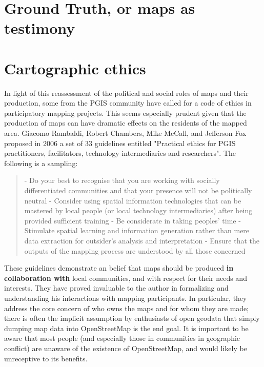 \documentclass[11pt]{report}
\begin{document}
\section{Ground Truth, or maps as testimony}

\section{Cartographic ethics}

In light of this reassessment of the political and social roles of maps and their production, some from the PGIS community have called for a code of ethics in participatory mapping projects. This seems especially prudent given that the production of maps can have dramatic effects on the residents of the mapped area. Giacomo Rambaldi, Robert Chambers, Mike McCall, and Jefferson Fox proposed in 2006 a set of 33 guidelines entitled "Practical ethics for PGIS practitioners, facilitators, technology intermediaries and researchers". The following is a sampling:

\begin{quote}
- Do your best to recognise that you are working with socially differentiated communities and that your presence will not be politically neutral
- Consider using spatial information technologies that can be mastered by local people (or local technology intermediaries) after being provided sufficient training
- Be considerate in taking peoples' time
- Stimulate spatial learning and information generation rather than mere data extraction for outsider’s analysis and interpretation
- Ensure that the outputs of the mapping process are understood by all those concerned
\cite{rambaldi2006practical}
\end{quote}

These guidelines demonstrate an belief that maps should be produced \textbf{in collaboration with} local communities, and with respect for their needs and interests. They have proved invaluable to the author in formalizing and understanding his interactions with mapping participants. In particular, they address the core concern of who owns the maps and for whom they are made; there is often the implicit assumption by enthusiasts of open geodata that simply dumping map data into OpenStreetMap is the end goal. It is important to be aware that most people (and especially those in communities in geographic conflict) are unaware of the existence of OpenStreetMap, and would likely be unreceptive to its benefits. 
\end{document}
